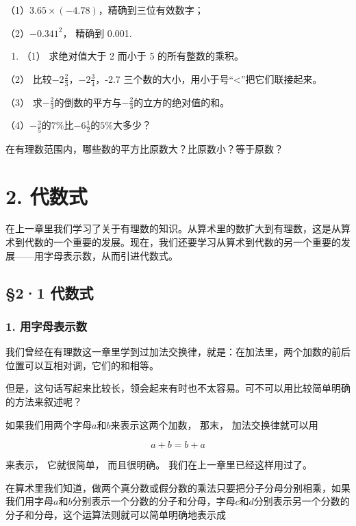 （1）\(3.65 \times (-4.78)\)，精确到三位有效数字；

（2）\(-0.341^{2}\)， 精确到 0.001.

\begin{enumerate}[start=5]
\item
  （1） 求绝对值大于 2 而小于 5 的所有整数的乘积。
\end{enumerate}

（2） 比较\(-2\frac{2}{3}\)，\(-2\frac{3}{4}\)，-2.7
三个数的大小，用小于号``\textless''把它们联接起来。

（3）
求\(-\frac{2}{3}\)的倒数的平方与\(-\frac{2}{3}\)的立方的绝对值的和。

（4）\(-\frac{3}{5}\)的\(7\%\)比\(-6\frac{1}{2}\)的\(5\%\)大多少？

在有理数范围内，哪些数的平方比原数大？比原数小？等于原数？

\chapter{2. 代数式}

在上一章里我们学习了关于有理数的知识。从算术里的数扩大到有理数，这是从算术到代数的一个重要的发展。现在，我们还要学习从算术到代数的另一个重要的发展------用字母表示数，从而引进代数式。

\section{§2·1 代数式}

\subsection{1. 用字母表示数}

我们曾经在有理数这一章里学到过加法交换律，就是：在加法里，两个加数的前后位置可以互相对调，它们的和相等。

但是，这句话写起来比较长，领会起来有时也不太容易。可不可以用比较简单明确的方法来叙述呢？

如果我们用两个字母\(a\)和\(b\)来表示这两个加数， 那末，
加法交换律就可以用

\[
a + b = b + a
\]

来表示， 它就很简单， 而且很明确。 我们在上一章里已经这样用过了。

在算术里我们知道，做两个真分数或假分数的乘法只要把分子分母分别相乘，如果我们用字母\(a\)和\(b\)分别表示一个分数的分子和分母，字母\(c\)和\(d\)分别表示另一个分数的分子和分母，这个运算法则就可以简单明确地表示成

